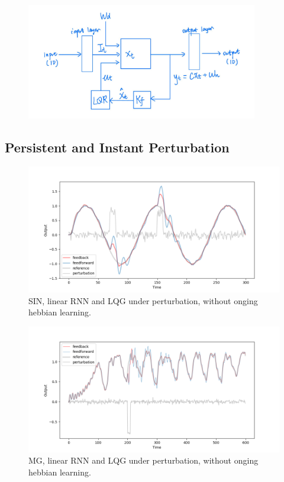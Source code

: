\documentclass[12pt, a4paper]{article}
\begin{document}
\begin{figure}[H]
    \centering
    \includegraphics[width=0.9\textwidth]{RNN/baseline_linear/fig/lqg_structure.jpg}
\end{figure}

\subsection*{Persistent and Instant Perturbation}

\begin{figure}[H]
    \centering
    \includegraphics[width=\textwidth]{RNN/baseline_linear/fig/SIN_lin_noise.png}
    \caption{SIN, linear RNN and LQG under perturbation, without onging hebbian learning.}
\end{figure}

\begin{figure}[H]
    \centering
    \includegraphics[width=\textwidth]{RNN/baseline_linear/fig/MG_lin_noise.png}
    \caption{MG, linear RNN and LQG under perturbation, without onging hebbian learning.}
\end{figure}
\end{document}
